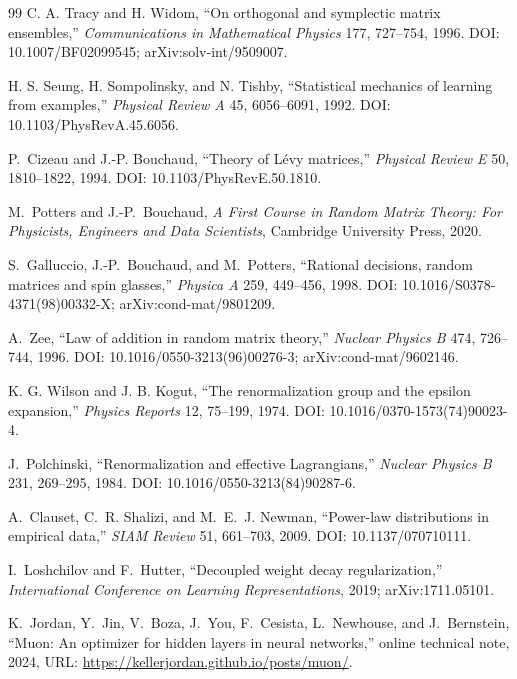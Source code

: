 \documentclass[10pt,twocolumn]{article}
\begin{document}
\begin{thebibliography}{99}
C. A. Tracy and H. Widom,
``On orthogonal and symplectic matrix ensembles,''
\emph{Communications in Mathematical Physics} 177, 727--754, 1996. DOI: 10.1007/BF02099545; arXiv:solv-int/9509007.

H. S. Seung, H. Sompolinsky, and N. Tishby,
``Statistical mechanics of learning from examples,''
\emph{Physical Review A} 45, 6056--6091, 1992.
DOI: 10.1103/PhysRevA.45.6056.

P.~Cizeau and J.-P. Bouchaud, ``Theory of L\'evy matrices,'' \emph{Physical Review E} 50, 1810--1822, 1994. DOI: 10.1103/PhysRevE.50.1810.

M.~Potters and J.-P.~Bouchaud, \emph{A First Course in Random Matrix Theory: For Physicists, Engineers and Data Scientists}, Cambridge University Press, 2020.

S.~Galluccio, J.-P.~Bouchaud, and M.~Potters, ``Rational decisions, random matrices and spin glasses,'' \emph{Physica A} 259, 449--456, 1998. DOI: 10.1016/S0378-4371(98)00332-X; arXiv:cond-mat/9801209.

A.~Zee, ``Law of addition in random matrix theory,'' \emph{Nuclear Physics B} 474, 726--744, 1996. DOI: 10.1016/0550-3213(96)00276-3; arXiv:cond-mat/9602146.

K. G. Wilson and J. B. Kogut, ``The renormalization group and the epsilon expansion,'' \emph{Physics Reports} 12, 75--199, 1974. DOI: 10.1016/0370-1573(74)90023-4.

J.~Polchinski, ``Renormalization and effective Lagrangians,'' \emph{Nuclear Physics B} 231, 269--295, 1984. DOI: 10.1016/0550-3213(84)90287-6.

A.~Clauset, C.~R. Shalizi, and M.~E.~J. Newman, ``Power-law distributions in empirical data,'' \emph{SIAM Review} 51, 661--703, 2009. DOI: 10.1137/070710111.

I.~Loshchilov and F.~Hutter, ``Decoupled weight decay regularization,'' \emph{International Conference on Learning Representations}, 2019; arXiv:1711.05101.

K.~Jordan, Y.~Jin, V.~Boza, J.~You, F.~Cesista, L.~Newhouse, and J.~Bernstein, ``Muon: An optimizer for hidden layers in neural networks,'' online technical note, 2024, URL: \url{https://kellerjordan.github.io/posts/muon/}.


\end{thebibliography}
\end{document}
